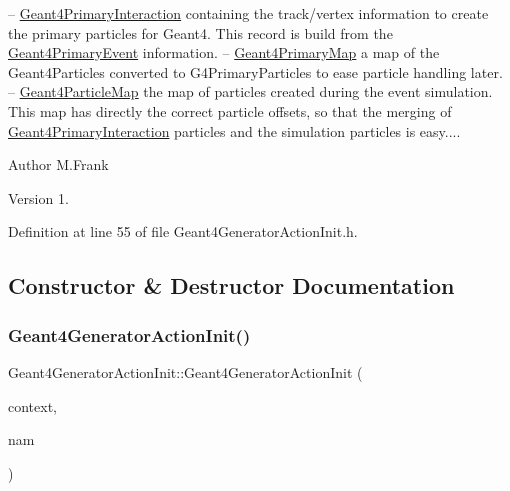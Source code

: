 -- \hyperlink{class_d_d4hep_1_1_simulation_1_1_geant4_primary_interaction}{Geant4\+Primary\+Interaction} containing the track/vertex information to create the primary particles for Geant4. This record is build from the \hyperlink{class_d_d4hep_1_1_simulation_1_1_geant4_primary_event}{Geant4\+Primary\+Event} information. -- \hyperlink{class_d_d4hep_1_1_simulation_1_1_geant4_primary_map}{Geant4\+Primary\+Map} a map of the Geant4\+Particles converted to G4\+Primary\+Particles to ease particle handling later. -- \hyperlink{class_d_d4hep_1_1_simulation_1_1_geant4_particle_map}{Geant4\+Particle\+Map} the map of particles created during the event simulation. This map has directly the correct particle offsets, so that the merging of \hyperlink{class_d_d4hep_1_1_simulation_1_1_geant4_primary_interaction}{Geant4\+Primary\+Interaction} particles and the simulation particles is easy....

\begin{DoxyAuthor}{Author}
M.\+Frank 
\end{DoxyAuthor}
\begin{DoxyVersion}{Version}
1. 
\end{DoxyVersion}


Definition at line 55 of file Geant4\+Generator\+Action\+Init.\+h.



\subsection{Constructor \& Destructor Documentation}
\hypertarget{class_d_d4hep_1_1_simulation_1_1_geant4_generator_action_init_a33f6258e3b8c24b7ccc09ee2a107e6d7}{}\label{class_d_d4hep_1_1_simulation_1_1_geant4_generator_action_init_a33f6258e3b8c24b7ccc09ee2a107e6d7} 
\subsubsection{\texorpdfstring{Geant4\+Generator\+Action\+Init()}{Geant4GeneratorActionInit()}}
{\footnotesize\ttfamily Geant4\+Generator\+Action\+Init\+::\+Geant4\+Generator\+Action\+Init (\begin{DoxyParamCaption}\item[{\hyperlink{class_d_d4hep_1_1_simulation_1_1_geant4_context}{Geant4\+Context} $\ast$}]{context,  }\item[{const std\+::string \&}]{nam }\end{DoxyParamCaption})}



